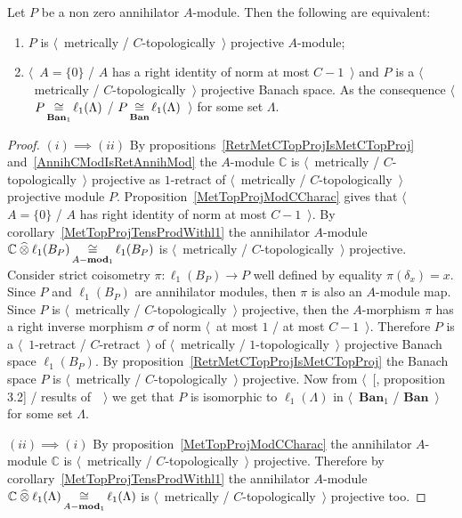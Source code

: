 \begin{proposition}\label{MetTopProjOfAnnihModCharac} Let $P$ be a non zero
annihilator $A$-module. Then the following are equivalent:

\begin{enumerate}[label = (\roman*)]
    \item $P$ is $\langle$~metrically / $C$-topologically~$\rangle$ projective
    $A$-module;

    \item $\langle$~$A= \{0 \}$ / $A$ has a right identity of norm at most
    $C-1$~$\rangle$ and $P$ is a $\langle$~metrically /
    $C$-topologically~$\rangle$ projective Banach space. As the consequence
    $\langle$~$P\mathop{\mathbin{\cong}}\limits_{\mathbf{Ban}_1}\ell_1(\Lambda)$ /
    $P\mathop{\mathbin{\cong}}\limits_{\mathbf{Ban}}\ell_1(\Lambda)$~$\rangle$ for some set $\Lambda$.
\end{enumerate}
\end{proposition}
\begin{proof} $(i)\implies (ii)$ By 
propositions~\ref{RetrMetCTopProjIsMetCTopProj} 
and~\ref{AnnihCModIsRetAnnihMod} the
$A$-module $\mathbb{C}$ is $\langle$~metrically / $C$-topologically~$\rangle$
projective as $1$-retract of $\langle$~metrically / $C$-topologically~$\rangle$
projective module $P$. Proposition~\ref{MetTopProjModCCharac} gives that
$\langle$~$A= \{0 \}$ / $A$ has right identity of norm at most $C-1$~$\rangle$.
By corollary~\ref{MetTopProjTensProdWithl1} the annihilator $A$-module
$\mathbb{C}\mathbin{\widehat{\otimes}}\ell_1(B_P)\mathop{\mathbin{\cong}}\limits_{A-\mathbf{mod}_1}\ell_1(B_P)$ is
$\langle$~metrically / $C$-topologically~$\rangle$ projective. Consider strict
coisometry $\pi:\ell_1(B_P)\to P$ well defined by equality $\pi(\delta_x)=x$.
Since $P$ and $\ell_1(B_P)$ are annihilator modules, then $\pi$ is also an
$A$-module map. Since $P$ is $\langle$~metrically / $C$-topologically~$\rangle$
projective, then the $A$-morphism $\pi$ has a right inverse morphism $\sigma$ of
norm  $\langle$~at most $1$ / at most $C-1$~$\rangle$. Therefore $P$ is a
$\langle$~$1$-retract / $C$-retract~$\rangle$ of $\langle$~metrically /
$1$-topologically~$\rangle$ projective Banach space $\ell_1(B_P)$. By
proposition~\ref{RetrMetCTopProjIsMetCTopProj} the Banach space $P$ is
$\langle$~metrically / $C$-topologically~$\rangle$ projective. Now from
$\langle$~[\cite{HelMetrFrQMod}, proposition 3.2] / results
of~\cite{KotheTopProjBanSp}~$\rangle$ we get that $P$ is isomorphic to
$\ell_1(\Lambda)$ in $\langle$~$\mathbf{Ban}_1$ / $\mathbf{Ban}$~$\rangle$ for
some set $\Lambda$. 

$(ii)\implies (i)$ By proposition~\ref{MetTopProjModCCharac} the annihilator
$A$-module $\mathbb{C}$ is $\langle$~metrically / $C$-topologically~$\rangle$
projective. Therefore by corollary~\ref{MetTopProjTensProdWithl1} the
annihilator $A$-module
$\mathbb{C}\mathbin{\widehat{\otimes}}\ell_1(\Lambda)\mathop{\mathbin{\cong}}\limits_{A-\mathbf{mod}_1}\ell_1(\Lambda)$ is
$\langle$~metrically / $C$-topologically~$\rangle$ projective too.
\end{proof}

